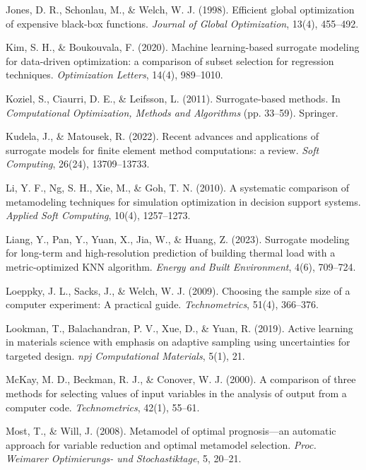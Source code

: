 \documentclass[sigconf,nonacm]{acmart}
\begin{document}
\begin{enumerate}[label={[\arabic*]}]
\item Jones, D. R., Schonlau, M., \& Welch, W. J. (1998). Efficient global optimization of expensive black-box functions. \textit{Journal of Global Optimization}, 13(4), 455--492.

\item Kim, S. H., \& Boukouvala, F. (2020). Machine learning-based surrogate modeling for data-driven optimization: a comparison of subset selection for regression techniques. \textit{Optimization Letters}, 14(4), 989--1010.

\item Koziel, S., Ciaurri, D. E., \& Leifsson, L. (2011). Surrogate-based methods. In \textit{Computational Optimization, Methods and Algorithms} (pp. 33--59). Springer.

\item Kudela, J., \& Matousek, R. (2022). Recent advances and applications of surrogate models for finite element method computations: a review. \textit{Soft Computing}, 26(24), 13709--13733.

\item Li, Y. F., Ng, S. H., Xie, M., \& Goh, T. N. (2010). A systematic comparison of metamodeling techniques for simulation optimization in decision support systems. \textit{Applied Soft Computing}, 10(4), 1257--1273.

\item Liang, Y., Pan, Y., Yuan, X., Jia, W., \& Huang, Z. (2023). Surrogate modeling for long-term and high-resolution prediction of building thermal load with a metric-optimized KNN algorithm. \textit{Energy and Built Environment}, 4(6), 709--724.

\item Loeppky, J. L., Sacks, J., \& Welch, W. J. (2009). Choosing the sample size of a computer experiment: A practical guide. \textit{Technometrics}, 51(4), 366--376.

\item Lookman, T., Balachandran, P. V., Xue, D., \& Yuan, R. (2019). Active learning in materials science with emphasis on adaptive sampling using uncertainties for targeted design. \textit{npj Computational Materials}, 5(1), 21.

\item McKay, M. D., Beckman, R. J., \& Conover, W. J. (2000). A comparison of three methods for selecting values of input variables in the analysis of output from a computer code. \textit{Technometrics}, 42(1), 55--61.

\item Most, T., \& Will, J. (2008). Metamodel of optimal prognosis—an automatic approach for variable reduction and optimal metamodel selection. \textit{Proc. Weimarer Optimierungs- und Stochastiktage}, 5, 20--21.


\end{enumerate}
\end{document}
